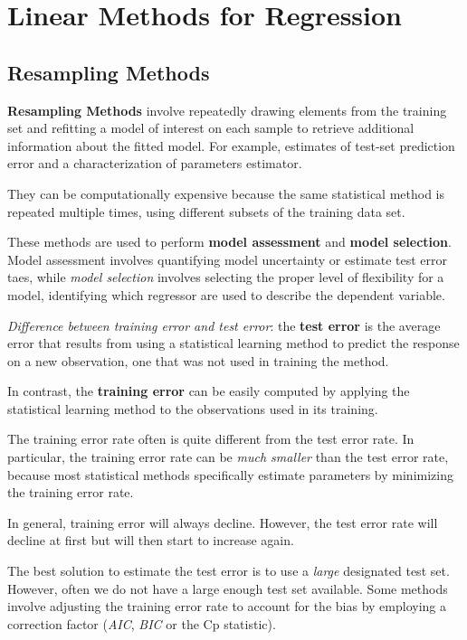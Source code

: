 \chapter{Linear Methods for Regression}
\section{Resampling Methods}
\textbf{Resampling Methods} involve repeatedly drawing elements from the training set and refitting a model of interest on each sample to retrieve additional information about the fitted model. For example, estimates of test-set prediction error and a characterization of parameters estimator.

They can be computationally expensive because the same statistical method is repeated multiple times, using different subsets of the training data set.

These methods are used to perform \textbf{model assessment} and \textbf{model selection}. Model assessment involves quantifying model uncertainty or estimate test error taes, while \textit{model selection} involves selecting the proper level of flexibility for a model, identifying which regressor are used to describe the dependent variable.

\textit{Difference between training error and test error}: the \textbf{test error} is the average error that results from using a statistical learning method to predict the response on a new observation, one that was not used in training the method.

In contrast, the \textbf{training error} can be easily computed by applying the statistical learning method to the observations used in its training.

The training error rate often is quite different from the test error rate. In particular, the training error rate can be \textit{much smaller} than the test error rate, because most statistical methods specifically estimate parameters by minimizing the training error rate.

In general, training error will always decline. However, the test error rate will decline at first but will then start to increase again.

The best solution to estimate the test error is to use a \textit{large} designated test set. However, often we do not have a large enough test set available. Some methods involve adjusting the training error rate to account for the bias by employing a correction factor (\textit{AIC}, \textit{BIC} or the Cp statistic).

